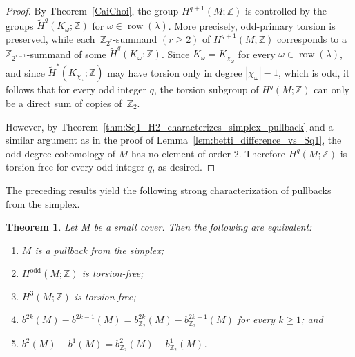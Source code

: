 \documentclass{amsart}
\newcommand{\Z}{\mathbb{Z}}
\DeclareMathOperator{\odd}{odd}
\DeclareMathOperator{\row}{row}
\theoremstyle{plain}
\newtheorem{theorem}{Theorem}[section]
\numberwithin{equation}{section}
\theoremstyle{definition}
\theoremstyle{remark}
\begin{document}
\begin{proof}
    By Theorem~\ref{CaiChoi}, the group $H^{q+1}(M;\Z)$ is controlled by the groups $\widetilde H^q(K_\omega;\Z)$ for $\omega\in\row(\lambda)$.
    More precisely, odd-primary torsion is preserved, while each~$\Z_{2^r}$-summand $(r\ge 2)$ of $H^{q+1}(M;\Z)$ corresponds to a $\Z_{2^{r-1}}$-summand of some $\widetilde H^q(K_\omega;\Z)$.
    Since $K_\omega=K_{\chi_\omega}$ for every $\omega\in\row(\lambda)$, and since $\widetilde H^*(K_{\chi_\omega};\Z)$ may have torsion only in degree $|\chi_\omega|-1$, which is odd, it follows that for every odd integer $q$, the torsion subgroup of $H^q(M;\Z)$ can only be a direct sum of copies of~$\Z_2$.
    
    However, by Theorem~\ref{thm:Sq1_H2_characterizes_simplex_pullback} and a similar argument as in the proof of Lemma~\ref{lem:betti_difference_vs_Sq1}, the odd-degree cohomology of $M$ has no element of order $2$.
    Therefore $H^q(M;\Z)$ is torsion-free for every odd integer $q$, as desired.
\end{proof}


The preceding results yield the following strong characterization of pullbacks from the simplex.
\begin{theorem}\label{thm:odd-torsionfree-betti-characterization}
    Let $M$ be a small cover.
    Then the following are equivalent:
    \begin{enumerate}
        \item\label{torsion1} $M$ is a pullback from the simplex;
        \item\label{torsion2} $H^{\odd}(M;\Z)$ is torsion-free;
        \item\label{torsion3} $H^3(M;\Z)$ is torsion-free;
        \item\label{torsion4} $b^{2k}(M)-b^{2k-1}(M) = b^{2k}_{\Z_2}(M)-b^{2k-1}_{\Z_2}(M)$ for every $k\ge 1$; and
        \item\label{torsion5} $b^2(M)-b^1(M) =b^2_{\Z_2}(M)-b^1_{\Z_2}(M)$.
    \end{enumerate}
\end{theorem}
\end{document}
